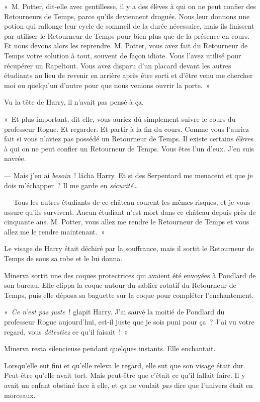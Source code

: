 «~M. Potter, dit-elle avec gentillesse, il y a des élèves à qui on ne peut confier des Retourneurs de Temps, parce qu'ils deviennent drogués. Nous leur donnons une potion qui rallonge leur cycle de sommeil de la durée nécessaire, mais ils finissent par utiliser le Retourneur de Temps pour bien plus que de la présence en cours. Et nous devons alors les reprendre. M. Potter, vous avez fait du Retourneur de Temps votre solution à tout, souvent de façon idiote. Vous l'avez utilisé pour récupérer un Rapeltout. Vous avez disparu d'un placard devant les autres étudiants au lieu de revenir en arrière après être sorti et d'être venu me chercher moi ou quelqu'un d'autre pour que nous venions ouvrir la porte.~»

Vu la tête de Harry, il n'avait pas pensé à ça.

«~Et plus important, dit-elle, vous auriez dû simplement suivre le cours du professeur Rogue. Et regarder. Et partir à la fin du cours. Comme vous l'auriez fait si vous n'aviez pas possédé un Retourneur de Temps. Il existe certains élèves à qui on ne peut confier un Retourneur de Temps. Vous êtes l'un d'eux. J'en suis navrée.

--- Mais j'en ai \emph{besoin}~! lâcha Harry. Et si des Serpentard me menacent et que je dois m'échapper~? Il me garde en \emph{sécurité}…

--- Tous les autres étudiants de ce château courent les mêmes risques, et je vous assure qu'ils survivent. Aucun étudiant n'est mort dans ce château depuis près de cinquante ans. M. Potter, vous allez me rendre le Retourneur de Temps et vous allez me le rendre maintenant.~»

Le visage de Harry était déchiré par la souffrance, mais il sortit le Retourneur de Temps de sous sa robe et le lui donna.

Minerva sortit une des coques protectrices qui avaient été envoyées à Poudlard de son bureau. Elle clippa la coque autour du sablier rotatif du Retourneur de Temps, puis elle déposa sa baguette sur la coque pour compléter l'enchantement.

«~\emph{Ce n'est pas juste}~! glapit Harry. J'ai sauvé la moitié de Poudlard du professeur Rogue aujourd'hui, est-il juste que je sois puni pour ça~? J'ai vu votre regard, vous \emph{détestiez} ce qu'il faisait~!~»

Minerva resta silencieuse pendant quelques instants. Elle enchantait.

Lorsqu'elle eut fini et qu'elle releva le regard, elle sut que son visage était dur. Peut-être qu'elle avait tort. Mais peut-être que c'était ce qu'il fallait faire. Il y avait un enfant obstiné face à elle, et ça ne voulait \emph{pas} dire que l'univers était en morceaux.

